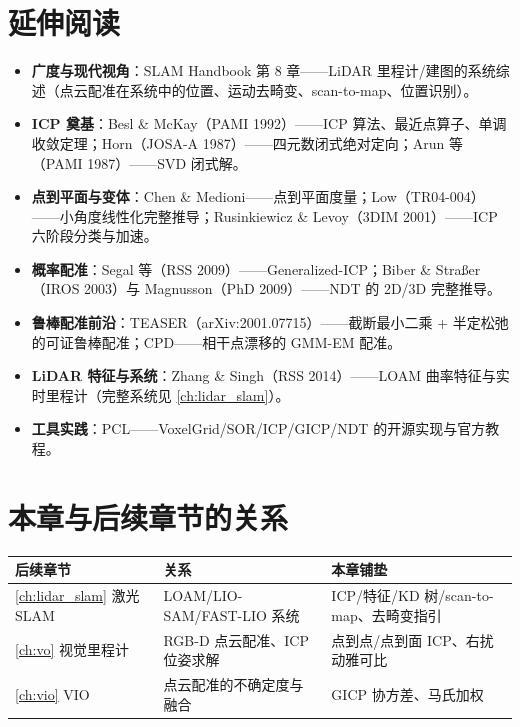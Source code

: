 \section*{延伸阅读}
\begin{itemize}
  \item \textbf{广度与现代视角}：SLAM Handbook\cite{carlone2026handbook} 第 8 章——LiDAR 里程计/建图的系统综述（点云配准在系统中的位置、运动去畸变、scan-to-map、位置识别）。
  \item \textbf{ICP 奠基}：Besl \& McKay\cite{besl1992icp}（PAMI 1992）——ICP 算法、最近点算子、单调收敛定理；Horn\cite{horn1987absolute}（JOSA-A 1987）——四元数闭式绝对定向；Arun 等\cite{arun1987leastsquares}（PAMI 1987）——SVD 闭式解。
  \item \textbf{点到平面与变体}：Chen \& Medioni\cite{chen1992pointplane}——点到平面度量；Low\cite{low2004p2plane}（TR04-004）——小角度线性化完整推导；Rusinkiewicz \& Levoy\cite{rusinkiewicz2001efficient}（3DIM 2001）——ICP 六阶段分类与加速。
  \item \textbf{概率配准}：Segal 等\cite{segal2009gicp}（RSS 2009）——Generalized-ICP；Biber \& Straßer\cite{biber2003ndt}（IROS 2003）与 Magnusson\cite{magnusson2009ndt}（PhD 2009）——NDT 的 2D/3D 完整推导。
  \item \textbf{鲁棒配准前沿}：TEASER\cite{yang2021teaser}（arXiv:2001.07715）——截断最小二乘 + 半定松弛的可证鲁棒配准；CPD\cite{myronenko2010cpd}——相干点漂移的 GMM-EM 配准。
  \item \textbf{LiDAR 特征与系统}：Zhang \& Singh\cite{zhang2014loam}（RSS 2014）——LOAM 曲率特征与实时里程计（完整系统见 \cref{ch:lidar_slam}）。
  \item \textbf{工具实践}：PCL\cite{rusu2011pcl}——VoxelGrid/SOR/ICP/GICP/NDT 的开源实现与官方教程。
\end{itemize}

\section*{本章与后续章节的关系}
\begin{table}[H]\centering\small
\begin{tabular}{lll}
\toprule
后续章节 & 关系 & 本章铺垫 \\
\midrule
\cref{ch:lidar_slam} 激光 SLAM & LOAM/LIO-SAM/FAST-LIO 系统 & ICP/特征/KD 树/scan-to-map、去畸变指引 \\
\cref{ch:vo} 视觉里程计 & RGB-D 点云配准、ICP 位姿求解 & 点到点/点到面 ICP、右扰动雅可比 \\
\cref{ch:vio} VIO & 点云配准的不确定度与融合 & GICP 协方差、马氏加权 \\
\bottomrule
\end{tabular}
\end{table}

